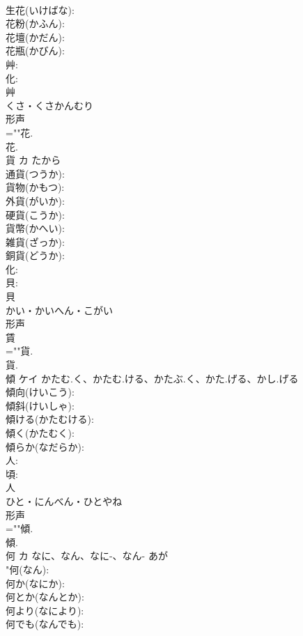 \documentclass[8pt]{extreport}
\begin{document}
\begin{CJK}{UTF8}{min}
\\	生花(いけばな): 
\\	花粉(かふん): 
\\	花壇(かだん): 
\\	花瓶(かびん): 
\\	艸: 
\\	化: 
\\	艸	
\\	くさ・くさかんむり	
\\	形声 
\\	=""花.
\\	花.
\\	貨	カ	たから		
\\	通貨(つうか): 
\\	貨物(かもつ): 
\\	外貨(がいか): 
\\	硬貨(こうか): 
\\	貨幣(かへい): 
\\	雑貨(ざっか): 
\\	銅貨(どうか): 
\\	化: 
\\	貝: 
\\	貝	
\\	かい・かいへん・こがい	
\\	形声 
\\	賃 
\\	=""貨.
\\	貨.
\\	傾	ケイ	かたむ.く、かたむ.ける、かたぶ.く、かた.げる、かし.げる		
\\	傾向(けいこう): 
\\	傾斜(けいしゃ): 
\\	傾ける(かたむける): 
\\	傾く(かたむく): 
\\	傾らか(なだらか): 
\\	人: 
\\	頃: 
\\	人	
\\	ひと・にんべん・ひとやね	
\\	形声 
\\	=""傾.
\\	傾.
\\	何	カ	なに、なん、なに-、なん-	あが	
\\	"何(なん): 
\\	何か(なにか): 
\\	何とか(なんとか): 
\\	何より(なにより): 
\\	何でも(なんでも): 

\end{CJK}
\end{document}
